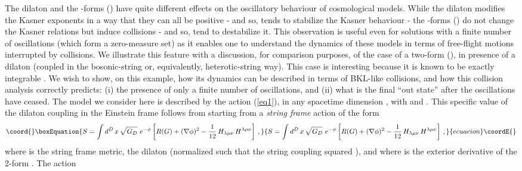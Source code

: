 \documentclass[a4paper,12pt]{article}
\begin{document}
The dilaton  and the \coordHE{}-forms (\coordHE{}) 
have quite different effects on the oscillatory behaviour of
cosmological models. While the dilaton
modifies the Kasner exponents in a way that
they can all be positive - and so, tends to stabilize the
Kasner behaviour -
the \coordHE{}-forms (\coordHE{}) do not change
the Kasner relations but induce collisions - and so, tend to destabilize it.
This observation is useful even for solutions with
a finite number of oscillations (which form a zero-measure set) 
as it enables one to understand
the dynamics of these models in terms of  free-flight motions interrupted
by collisions. 
We illustrate this feature with
a discussion, for comparison purposes, of the case 
of a two-form (\coordHE{}), in presence of a dilaton (coupled in the 
bosonic-string or, equivalently, heterotic-string way). This case is 
interesting because it is known to be exactly integrable \cite{MV}. We 
wish to show, on this example, how its dynamics can be described in 
terms of BKL-like collisions, and how this collision analysis correctly 
predicts: (i) the presence of only a finite number of oscillations, and 
(ii) what is the final ``out state'' after the oscillations have ceased. 
The model we consider here is described by the
action (\ref{eq1}), in any spacetime 
dimension \coordHE{}, with \coordHE{} and \coordHE{}. 
This 
specific value of the dilaton coupling in the Einstein frame follows 
from starting from a {\it string frame} action of the form
\begin{equation}\coord{}\boxEquation{
S = \int d^D \, x \, \sqrt{G_D} \ e^{-\phi} \left[ R(G) + (\nabla 
\phi)^2 - \frac{1}{12} \, H_{\lambda \mu \nu} \, H^{\lambda \mu \nu} 
\right]\, , \label{eq28}
}{
S = \int d^D \, x \, \sqrt{G_D} \ e^{-\phi} \left[ R(G) + (\nabla 
\phi)^2 - \frac{1}{12} \, H_{\lambda \mu \nu} \, H^{\lambda \mu \nu} 
\right]\, , }{ecuacion}\coordE{}\end{equation}
where \coordHE{} is the 
string 
frame metric, \coordHE{} the dilaton (normalized 
such that the string coupling squared \coordHE{}), and where 
\coordHE{} 
is the exterior derivative of the 2-form \coordHE{}. The action 
\end{document}
